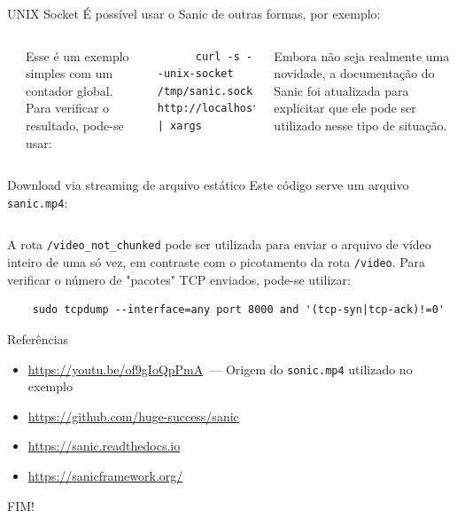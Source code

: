 \documentclass[utf8]{beamer}
\begin{document}
\begin{frame}[fragile]{UNIX Socket}
  É possível usar o Sanic de outras formas, por exemplo:
  \vfill
  \begin{columns}[c]
    \inputminted{python}{unix_socket_sanic.py}
    Esse é um exemplo simples com um contador global.
    Para verificar o resultado, pode-se usar:
    \begin{verbatim}
      curl -s --unix-socket /tmp/sanic.sock http://localhost/ | xargs
    \end{verbatim}
    \vfill
    Embora não seja realmente uma novidade,
    a documentação do Sanic foi atualizada
    para explicitar que ele pode ser utilizado nesse tipo de situação.
  \end{columns}
\end{frame}


\begin{frame}[fragile]{Download via streaming de arquivo estático}
  Este código serve um arquivo \texttt{sanic.mp4}:
  \inputminted{python}{stream_video.py}
  \vfill
  A rota \texttt{/video\_not\_chunked}
  pode ser utilizada para enviar
  o arquivo de vídeo inteiro de uma só vez,
  em contraste com o picotamento da rota \texttt{/video}.
  Para verificar o número de "pacotes" TCP enviados,
  pode-se utilizar:
  \begin{verbatim}
    sudo tcpdump --interface=any port 8000 and '(tcp-syn|tcp-ack)!=0'
  \end{verbatim}
\end{frame}


\begin{frame}{Referências}
  \begin{itemize}
    \fontsize{.8em}{0}\selectfont
    \item \url{https://youtu.be/of9gIoQpPmA}~---
          Origem do \texttt{sonic.mp4} utilizado no exemplo
    \item \url{https://github.com/huge-success/sanic}
    \item \url{https://sanic.readthedocs.io}
    \item \url{https://sanicframework.org/}
  \end{itemize}
  \vfill
  \begin{center}\fontsize{2cm}{0}\selectfont
    FIM!
  \end{center}
\end{frame}
\end{document}
